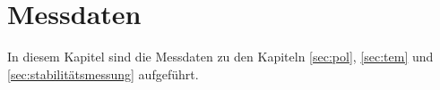 \section{Messdaten}

In diesem Kapitel sind die Messdaten zu den Kapiteln \ref{sec:pol}, \ref{sec:tem}
und \ref{sec:stabilitätsmessung} aufgeführt.






